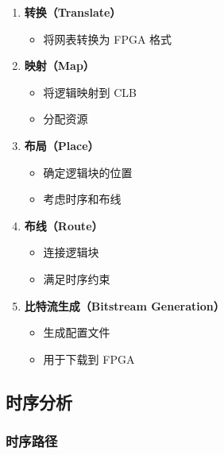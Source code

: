\begin{enumerate}
  \item \textbf{转换（Translate）}
    \begin{itemize}
      \item 将网表转换为 FPGA 格式
    \end{itemize}

  \item \textbf{映射（Map）}
    \begin{itemize}
      \item 将逻辑映射到 CLB
      \item 分配资源
    \end{itemize}

  \item \textbf{布局（Place）}
    \begin{itemize}
      \item 确定逻辑块的位置
      \item 考虑时序和布线
    \end{itemize}

  \item \textbf{布线（Route）}
    \begin{itemize}
      \item 连接逻辑块
      \item 满足时序约束
    \end{itemize}

  \item \textbf{比特流生成（Bitstream Generation）}
    \begin{itemize}
      \item 生成配置文件
      \item 用于下载到 FPGA
    \end{itemize}
\end{enumerate}

\subsection{时序分析}

\subsubsection{时序路径}

